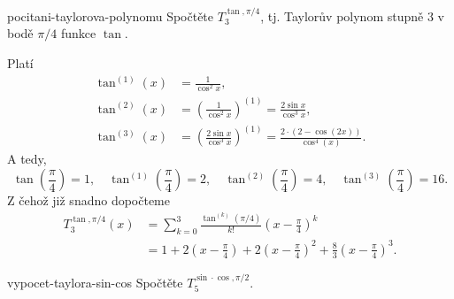 \begin{problem}{}{pocitani-taylorova-polynomu}
 Spočtěte $T^{\tan,\pi / 4}_3$, tj. Taylorův polynom stupně $3$ v bodě $\pi / 4$
 funkce $\tan$.
\end{problem}
\begin{probsol}
 Platí
 \begin{align*}
  \tan^{(1)}(x) &= \frac{1}{\cos^2 x},\\
  \tan^{(2)}(x) &= \left( \frac{1}{\cos ^2x} \right)^{(1)} =
  \frac{2\sin x}{\cos^3 x},\\
  \tan^{(3)}(x) &= \left( \frac{2 \sin x}{\cos^3 x} \right)^{(1)} = \frac{2
  \cdot \left(2 - \cos{\left(2 x \right)}\right)}{\cos^{4}{\left(x \right)}}. 
 \end{align*}
 A tedy,
 \[
  \tan \left( \frac{\pi}{4} \right) = 1, \quad \tan^{(1)} \left( \frac{\pi}{4}
   \right) = 2, \quad \tan^{(2)} \left( \frac{\pi}{4} \right) = 4, \quad
   \tan^{(3)} \left( \frac{\pi}{4} \right) = 16.
 \]
 Z čehož již snadno dopočteme
 \begin{align*}
  T^{\tan,\pi / 4}_3(x) &= \sum_{k=0}^3 \frac{\tan^{(k)}(\pi / 4)}{k!}\left( x -
  \frac{\pi}{4}\right)^{k}\\
                        &= 1 + 2 \left( x - \frac{\pi}{4} \right) + 2 \left( x - \frac{\pi}{4}
  \right)^2 + \frac{8}{3} \left( x - \frac{\pi}{4} \right)^3.
 \end{align*}
\end{probsol}
\begin{exercise}{}{vypocet-taylora-sin-cos}
 Spočtěte $T^{\sin \cdot \cos,\pi / 2}_5$.
\end{exercise}
